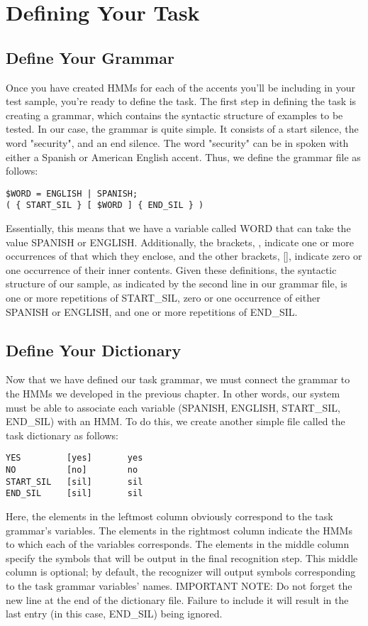 \documentclass{wileySev}
\begin{document}
\chapter{Defining Your Task}
\section{Define Your Grammar}
Once you have created HMMs for each of the accents you'll be including in your test sample, you're ready to define the task. The first step in defining the task is creating a grammar, which contains the syntactic structure of examples to be tested. In our case, the grammar is quite simple. It consists of a start silence, the word "security", and an end silence. The word "security" can be in spoken with either a Spanish or American English accent. Thus, we define the grammar file as follows:
\begin{verbatim}
$WORD = ENGLISH | SPANISH;
( { START_SIL } [ $WORD ] { END_SIL } )
\end{verbatim}
Essentially, this means that we have a variable called WORD that can take the value SPANISH or ENGLISH. Additionally, the brackets, {}, indicate one or more occurrences of that which they enclose, and the other brackets, [], indicate zero or one occurrence of their inner contents. Given these definitions, the syntactic structure of our sample, as indicated by the second line in our grammar file, is one or more repetitions of START\_SIL, zero or one occurrence of either SPANISH or ENGLISH, and one or more repetitions of END\_SIL.

\section{Define Your Dictionary}
Now that we have defined our task grammar, we must connect the grammar to the HMMs we developed in the previous chapter. In other words, our system must be able to associate each variable (SPANISH, ENGLISH, START\_SIL, END\_SIL) with an HMM. To do this, we create another simple file called the task dictionary as follows:
\begin{verbatim}
YES			[yes]		yes
NO			[no]		no
START_SIL	[sil]		sil
END_SIL		[sil]		sil
\end{verbatim}
Here, the elements in the leftmost column obviously correspond to the task grammar's variables. The elements in the rightmost column indicate the HMMs to which each of the variables corresponds. The elements in the middle column specify the symbols that will be output in the final recognition step. This middle column is optional; by default, the recognizer will output symbols corresponding to the task grammar variables' names.
IMPORTANT NOTE: Do not forget the new line at the end of the dictionary file. Failure to include it will result in the last entry (in this case, END\_SIL) being ignored.
\end{document}
